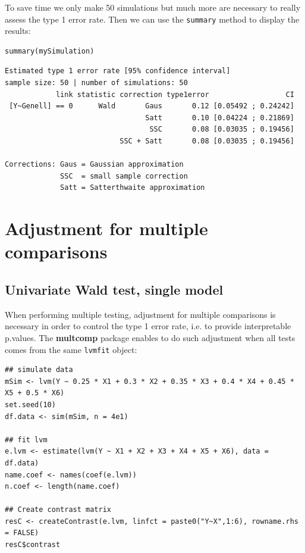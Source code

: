 \documentclass[12pt]{article}
\begin{document}
To save time we only make 50 simulations but much more are necessary
to really assess the type 1 error rate. Then we can use the \texttt{summary}
method to display the results:
\lstset{language=r,label= ,caption= ,captionpos=b,numbers=none}
\begin{lstlisting}
summary(mySimulation)
\end{lstlisting}

\begin{verbatim}
Estimated type 1 error rate [95% confidence interval]
sample size: 50 | number of simulations: 50
            link statistic correction type1error                  CI
 [Y~Genell] == 0      Wald       Gaus       0.12 [0.05492 ; 0.24242]
                                 Satt       0.10 [0.04224 ; 0.21869]
                                  SSC       0.08 [0.03035 ; 0.19456]
                           SSC + Satt       0.08 [0.03035 ; 0.19456]

Corrections: Gaus = Gaussian approximation 
             SSC  = small sample correction 
             Satt = Satterthwaite approximation
\end{verbatim}

\clearpage

\section{Adjustment for multiple comparisons}
\label{sec:org3132637}
\subsection{Univariate Wald test, single model}
\label{sec:orgc7110d9}

When performing multiple testing, adjustment for multiple comparisons
is necessary in order to control the type 1 error rate, i.e. to
provide interpretable p.values. The \textbf{multcomp} package enables to do
such adjustment when all tests comes from the same \texttt{lvmfit} object:
\lstset{language=r,label= ,caption= ,captionpos=b,numbers=none}
\begin{lstlisting}
## simulate data
mSim <- lvm(Y ~ 0.25 * X1 + 0.3 * X2 + 0.35 * X3 + 0.4 * X4 + 0.45 * X5 + 0.5 * X6)
set.seed(10)
df.data <- sim(mSim, n = 4e1)

## fit lvm
e.lvm <- estimate(lvm(Y ~ X1 + X2 + X3 + X4 + X5 + X6), data = df.data)
name.coef <- names(coef(e.lvm))
n.coef <- length(name.coef)

## Create contrast matrix
resC <- createContrast(e.lvm, linfct = paste0("Y~X",1:6), rowname.rhs = FALSE)
resC$contrast
\end{lstlisting}
\end{document}
